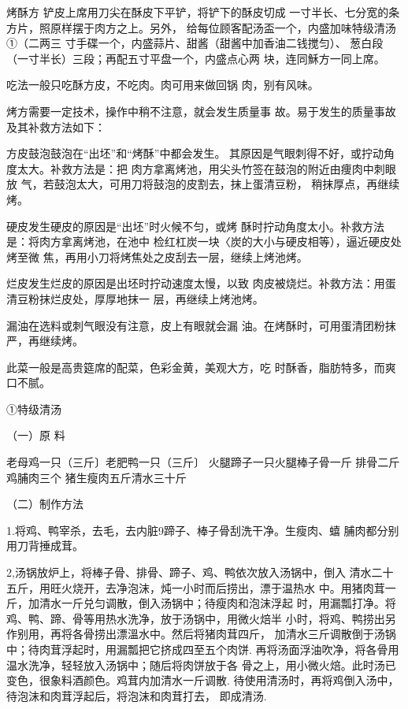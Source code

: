 \begin{recipe}{烤酥方}
\step 铲皮上席用刀尖在酥皮下平铲，将铲下的酥皮切成
一寸半长、七分宽的条方片，照原样摆于肉方之上。另外，
给每位顾客配汤盃一个，内盛加味特级清汤①（二两三
寸手碟一个，内盛蒜片、甜酱（甜酱中加香油二钱搅匀）、
葱白段（一寸半长）三段；再配五寸平盘一个，内盛点心两 块，连同穌方一同上席。

\step 吃法一般只吃酥方皮，不吃肉。肉可用来做回锅 肉，别有风味。

\notice

烤方需要一定技术，操作中稍不注意，就会发生质量事
故。易于发生的质量事故及其补救方法如下：

\step 方皮鼓泡鼓泡在“出坯”和“烤酥”中都会发生。
其原因是气眼刺得不好，或拧动角度太大。补救方法是：把
肉方拿离烤池，用尖头竹签在鼓泡的附近由痩肉中刺眼放
气，若鼓泡太大，可用刀将鼓泡的皮割去，抹上蛋清豆粉， 稍抹厚点，再继续烤。

\step 硬皮发生硬皮的原因是“出坯”时火候不匀，或烤
酥时拧动角度太小。补救方法是：将肉方拿离烤池，在池中
检红杠炭一块〈炭的大小与硬皮相等），逼近硬皮处烤至微
焦，再用小刀将烤焦处之皮刮去一层，继续上烤池烤。

\step 烂皮发生烂皮的原因是出坯时拧动速度太慢，以致
肉皮被烧烂。补救方法：用蛋清豆粉抹烂皮处，厚厚地抹一 层，再继续上烤池烤。

\step 漏油在选料或刺气眼没有注意，皮上有眼就会漏
油。在烤酥时，可用蛋清团粉抹严，再继续烤。

\notes

此菜一般是高贵筵席的配菜，色彩金黄，美观大方，吃
时酥香，脂肪特多，而爽口不腻。

①特级清汤

（一）原 料

老母鸡一只（三斤〕老肥鸭一只（三斤〕
火腿蹄子一只火腿棒子骨一斤
排骨二斤鸡脯肉三个
猪生瘦肉五斤清水三十斤

（二）制作方法

1.将鸡、鸭宰杀，去毛，去内脏9蹄子、棒子骨刮洗干净。生瘦肉、蟢 脯肉都分别用刀背捶成茸。

2,汤锅放炉上，将棒子骨、排骨、蹄子、鸡、鸭依次放入汤锅中，倒入 清水二十五斤，用旺火烧开，去净泡沫，炖一小时而后捞出，漂于温热水 中。用猪肉茸一斤，加清水一斤兑匀调散，倒入汤锅中；待瘦肉和泡沫浮起 时，用漏瓢打净。将鸡、鸭、蹄、骨等用热水洗净，放于汤锅中，用微火焙半 小时，将鸡、鸭捞出另作别用，再将各骨捞出漂溫水中。然后将猪肉茸四斤， 加清水三斤调散倒于汤锅中；待肉茸浮起时，用漏瓢把它挤成四至五个肉饼. 再将汤面浮油吹净，将各骨用温水洗净，轻轻放入汤锅中；随后将肉饼放于各 骨之上，用小微火焙。此时汤已变色，很象料酒颜色。鸡茸内加清水一斤调散. 待使用清汤时，再将鸡倒入汤中，待泡沫和肉茸浮起后，将泡沫和肉茸打去， 即成清汤.

\end{recipe}

